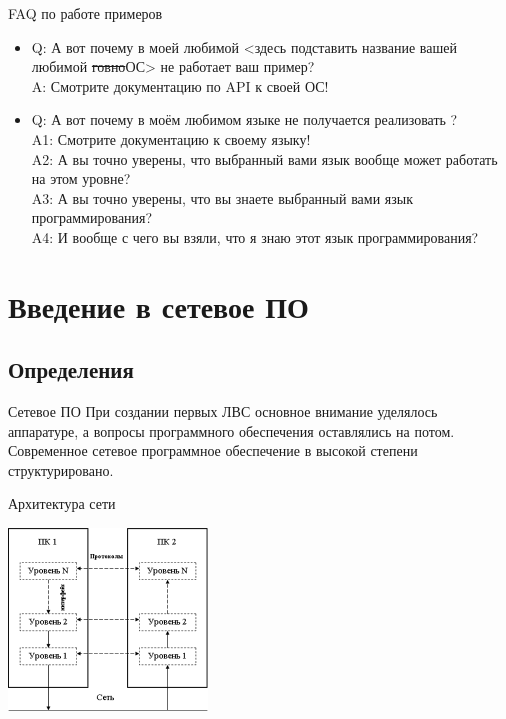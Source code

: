 \documentclass[ignorenonframetext, hyperref={pdftex, unicode}]{beamer}
\begin{document}
\begin{frame}{FAQ по работе примеров}
	\begin{itemize}
		\item Q: А вот почему в моей любимой {\footnotesize <здесь подставить название вашей любимой \sout{говно}ОС>} не работает ваш пример?\\
	A: Смотрите документацию по API к своей ОС!
		\item Q: А вот почему в моём любимом языке {\footnotesize <здесь подставить название вашего любимого языка>} не получается реализовать {\footnotesize <здесь подставить название фичи, которую не получается использовать>}?\\
	A1: Смотрите документацию к своему языку!\\
	A2: А вы точно уверены, что выбранный вами язык вообще может работать на этом уровне?\\
	A3: А вы точно уверены, что вы знаете выбранный вами язык программирования?\\
	A4: И вообще с чего вы взяли, что я знаю этот язык программирования?
	\end{itemize}
\end{frame}

\section{Введение в сетевое ПО}
\subsection{Определения}

\begin{frame}{Сетевое ПО}
	При создании первых ЛВС основное внимание уделялось аппаратуре,  а вопросы программного обеспечения оставлялись на потом.
	Современное сетевое программное обеспечение в высокой степени структурировано.
\end{frame}

\begin{frame}{Архитектура сети}
	\begin{center}
	\includegraphics[width=200px]{01-proto_interface.png}
	\end{center}
\end{frame}
\end{document}
